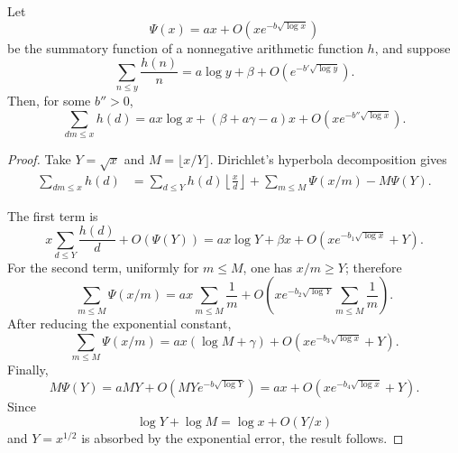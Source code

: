 \documentclass[10pt,a4paper]{amsart}
\begin{document}
\begin{proposition}\label{prop:hyperbola}
Let
\[
\Psi(x)=ax+O\!\left(xe^{-b\sqrt{\log x}}\right)
\]
be the summatory function of a nonnegative arithmetic function \(h\),
and suppose
\[
\sum_{n\le y}\frac{h(n)}n
=
a\log y+\beta
+
O\!\left(e^{-b'\sqrt{\log y}}\right).
\]
Then, for some \(b''>0\),
\[
\sum_{dm\le x}h(d)
=
ax\log x
+
(\beta+a\gamma-a)x
+
O\!\left(
xe^{-b''\sqrt{\log x}}
\right).
\]
\end{proposition}

\begin{proof}
Take \(Y=\sqrt{x}\) and \(M=\lfloor x/Y\rfloor\).  Dirichlet's
hyperbola decomposition gives
\begin{align*}
\sum_{dm\le x}h(d)
&=
\sum_{d\le Y}h(d)\left\lfloor\frac{x}{d}\right\rfloor
+
\sum_{m\le M}\Psi(x/m)
-
M\Psi(Y).
\end{align*}

The first term is
\[
x\sum_{d\le Y}\frac{h(d)}d+O(\Psi(Y))
=
ax\log Y+\beta x
+
O\!\left(
xe^{-b_1\sqrt{\log x}}+Y
\right).
\]
For the second term, uniformly for \(m\le M\), one has \(x/m\ge Y\);
therefore
\[
\sum_{m\le M}\Psi(x/m)
=
ax\sum_{m\le M}\frac1m
+
O\!\left(
x e^{-b_2\sqrt{\log Y}}
\sum_{m\le M}\frac1m
\right).
\]
After reducing the exponential constant,
\[
\sum_{m\le M}\Psi(x/m)
=
ax(\log M+\gamma)
+
O\!\left(
xe^{-b_3\sqrt{\log x}}+Y
\right).
\]
Finally,
\[
M\Psi(Y)
=
aMY
+
O\!\left(
MYe^{-b\sqrt{\log Y}}
\right)
=
ax
+
O\!\left(
xe^{-b_4\sqrt{\log x}}+Y
\right).
\]
Since
\[
\log Y+\log M
=
\log x+O(Y/x)
\]
and \(Y=x^{1/2}\) is absorbed by the exponential error, the result
follows.
\end{proof}
\end{document}
